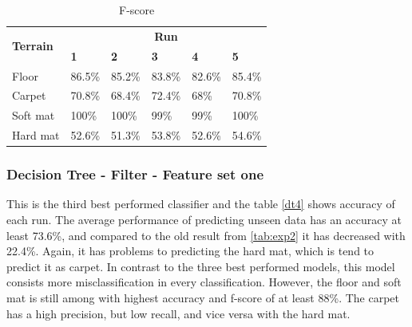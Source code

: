 \documentclass[USenglish]{ifimaster}  %
\begin{document}
\begin{table}[h]
	\centering
	\begin{tabular}{@{}llllll@{}}
		\toprule
		\multirow{2}{*}{\textbf{Terrain}} & \multicolumn{5}{c}{\textbf{Run}} \\ \cmidrule(l){2-6} 
		& \multicolumn{1}{l|}{\textbf{1}} & \multicolumn{1}{l|}{\textbf{2}} & \multicolumn{1}{l|}{\textbf{3}} & \multicolumn{1}{l|}{\textbf{4}} & \textbf{5} \\ \midrule
		\multicolumn{1}{l|}{Floor} & \multicolumn{1}{l|}{86.5\%} & \multicolumn{1}{l|}{85.2\%} & \multicolumn{1}{l|}{83.8\%} & \multicolumn{1}{l|}{82.6\%} & 85.4\% \\ \midrule
		\multicolumn{1}{l|}{Carpet} & \multicolumn{1}{l|}{70.8\%} & \multicolumn{1}{l|}{68.4\%} & \multicolumn{1}{l|}{72.4\%} & \multicolumn{1}{l|}{68\%} & 70.8\% \\ \midrule
		\multicolumn{1}{l|}{Soft mat} & \multicolumn{1}{l|}{100\%} & \multicolumn{1}{l|}{100\%} & \multicolumn{1}{l|}{99\%} & \multicolumn{1}{l|}{99\%} & 100\% \\ \midrule
		\multicolumn{1}{l|}{Hard mat} & \multicolumn{1}{l|}{52.6\%} & \multicolumn{1}{l|}{51.3\%} & \multicolumn{1}{l|}{53.8\%} & \multicolumn{1}{l|}{52.6\%} & 54.6\% \\ \bottomrule
	\end{tabular}
	\caption{F-score}
	\label{tab:nnset5fscore}
\end{table}
\FloatBarrier
\newpage

	
\subsubsection{Decision Tree - Filter - Feature set one}
This is the third best performed classifier and the table \ref{dt4} shows accuracy of each run. The average performance of predicting unseen data has an accuracy at least 73.6\%, and compared to the old result from \ref{tab:exp2} it has decreased with 22.4\%. Again, it has problems to predicting the hard mat, which is tend to predict it as carpet. In contrast to the three best performed models, this model consists more misclassification in every classification. However, the floor and soft mat is still among with highest accuracy and f-score of at least 88\%. The carpet has a high precision, but low recall, and vice versa with the hard mat.
\end{document}

